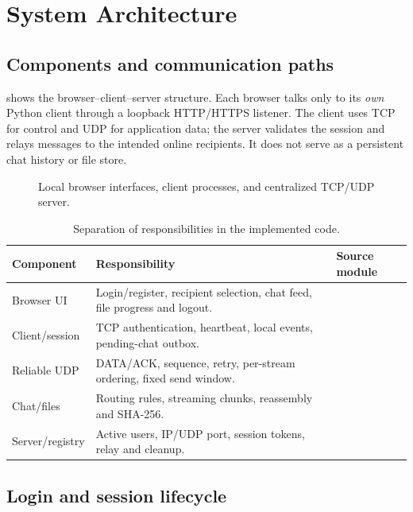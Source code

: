 \section{System Architecture}
\subsection{Components and communication paths}

 shows the browser--client--server structure. Each browser talks only to its \emph{own} Python client through a loopback HTTP/HTTPS listener. The client uses TCP for control and UDP for application data; the server validates the session and relays messages to the intended online recipients. It does not serve as a persistent chat history or file store.

\begin{figure}[H]
 \centering
 \resizebox{0.985\linewidth}{!}{}
 \caption{Local browser interfaces, client processes, and centralized TCP/UDP server.}
 \label{fig:architecture}
\end{figure}

\begin{table}[H]
\centering\small
\begin{tabularx}{\linewidth}{@{}L{3.05cm}Y L{2.9cm}@{}}
\toprule
\textbf{Component} & \textbf{Responsibility} & \textbf{Source module} \\
\midrule
Browser UI & Login/register, recipient selection, chat feed, file progress and logout. &  \\
Client/session & TCP authentication, heartbeat, local events, pending-chat outbox. &  \\
Reliable UDP & DATA/ACK, sequence, retry, per-stream ordering, fixed send window. &  \\
Chat/files & Routing rules, streaming chunks, reassembly and SHA-256. &  \\
Server/registry & Active users, IP/UDP port, session tokens, relay and cleanup. &  \\
\bottomrule
\end{tabularx}
\caption{Separation of responsibilities in the implemented code.}
\label{tab:modules}
\end{table}

\subsection{Login and session lifecycle}

